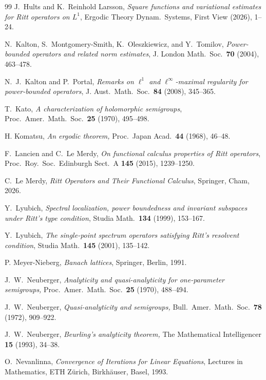 \documentclass[11pt]{amsart}
\numberwithin{equation}{section}
\theoremstyle{definition}
\theoremstyle{plain}
\begin{document}
\begin{thebibliography}{99}
J.~Hults and K.~Reinhold Larsson,
\emph{Square functions and variational estimates for Ritt operators on $L^1$},
Ergodic Theory Dynam.\ Systems, First View (2026), 1--24. 

N.~Kalton, S.~Montgomery-Smith, K.~Oleszkiewicz,  and Y.~Tomilov,
\emph{Power-bounded operators and related norm estimates},
J. London Math.\ Soc.\ \textbf{70} (2004), 463--478.

N.~J.~Kalton and P.~Portal, 
\emph{Remarks on $\ell^1$ and $\ell^\infty$-maximal regularity for power-bounded operators},
J. Aust.\ Math.\ Soc.\ \textbf{84} (2008), 345--365.

T.~Kato,
\emph{A characterization of holomorphic semigroups},
Proc.\ Amer.\ Math.\ Soc.\ \textbf{25} (1970), 495--498.

 H. Komatsu, \emph{
An ergodic theorem,}
Proc.\ Japan Acad.\ \textbf{44} (1968), 46--48.

F.~Lancien and C.~Le Merdy,
\emph{On functional calculus properties of Ritt operators},
Proc.\ Roy.\ Soc.\ Edinburgh Sect.\ A \textbf{145} (2015), 1239--1250.

C.~Le Merdy, 
\emph{Ritt Operators and Their Functional Calculus},
Springer, Cham, 2026.

Y.~Lyubich,
\emph{Spectral localization, power boundedness and invariant subspaces under Ritt's type condition},
Studia Math.\ \textbf{134} (1999), 153--167.

Y.~Lyubich,
\emph{The single-point spectrum operators satisfying Ritt's resolvent condition},
Studia Math.\ \textbf{145} (2001), 135--142.

P. Meyer-Nieberg, \emph{Banach lattices},  Springer, Berlin, 1991.

J.~W.~Neuberger, \emph{Analyticity and quasi-analyticity for one-parameter semigroups,} Proc.\ Amer.\ Math.\ Soc.\ \textbf{25} (1970), 488--494.

J.~W.~Neuberger, \emph{Quasi-analyticity and semigroups,}
Bull.\ Amer.\ Math.\ Soc.\ \textbf{78} (1972), 909--922.

 J.~W.~Neuberger, \emph{Beurling's analyticity theorem,}  The Mathematical Intelligencer \textbf{15} (1993), 34--38.

O.~Nevanlinna,
\emph{Convergence of Iterations for Linear Equations},
Lectures in Mathematics, ETH Z\"urich, Birkh\"auser, Basel, 1993.


\end{thebibliography}
\end{document}
